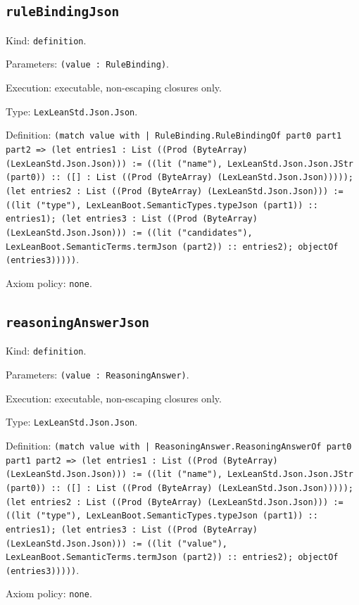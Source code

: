 \documentclass[11pt]{article}
\begin{document}
\subsection*{\texttt{ruleBindingJson}}
\noindent Kind: \texttt{definition}.\par
\noindent Parameters: \texttt{(value : RuleBinding)}.\par
\noindent Execution: executable, non-escaping closures only.\par
\noindent Type: \texttt{LexLeanStd.Json.Json}.\par
\noindent Definition: \texttt{(match value with | RuleBinding.RuleBindingOf part0 part1 part2 => (let entries1 : List ((Prod (ByteArray) (LexLeanStd.Json.Json))) := ((lit ("name"), LexLeanStd.Json.Json.JStr (part0)) :: ([] : List ((Prod (ByteArray) (LexLeanStd.Json.Json))))); (let entries2 : List ((Prod (ByteArray) (LexLeanStd.Json.Json))) := ((lit ("type"), LexLeanBoot.SemanticTypes.typeJson (part1)) :: entries1); (let entries3 : List ((Prod (ByteArray) (LexLeanStd.Json.Json))) := ((lit ("candidates"), LexLeanBoot.SemanticTerms.termJson (part2)) :: entries2); objectOf (entries3)))))}.\par
\noindent Axiom policy: \texttt{none}.\par
\subsection*{\texttt{reasoningAnswerJson}}
\noindent Kind: \texttt{definition}.\par
\noindent Parameters: \texttt{(value : ReasoningAnswer)}.\par
\noindent Execution: executable, non-escaping closures only.\par
\noindent Type: \texttt{LexLeanStd.Json.Json}.\par
\noindent Definition: \texttt{(match value with | ReasoningAnswer.ReasoningAnswerOf part0 part1 part2 => (let entries1 : List ((Prod (ByteArray) (LexLeanStd.Json.Json))) := ((lit ("name"), LexLeanStd.Json.Json.JStr (part0)) :: ([] : List ((Prod (ByteArray) (LexLeanStd.Json.Json))))); (let entries2 : List ((Prod (ByteArray) (LexLeanStd.Json.Json))) := ((lit ("type"), LexLeanBoot.SemanticTypes.typeJson (part1)) :: entries1); (let entries3 : List ((Prod (ByteArray) (LexLeanStd.Json.Json))) := ((lit ("value"), LexLeanBoot.SemanticTerms.termJson (part2)) :: entries2); objectOf (entries3)))))}.\par
\noindent Axiom policy: \texttt{none}.\par
\end{document}
